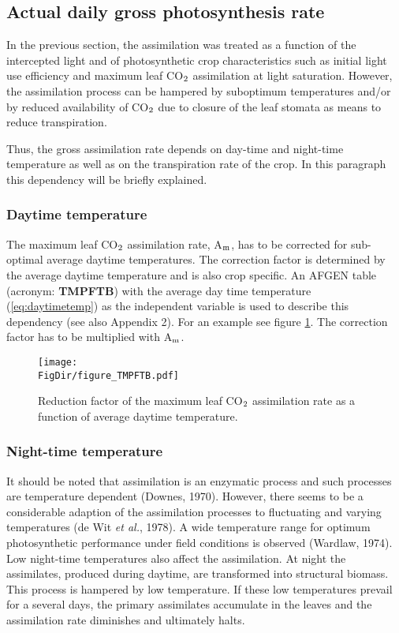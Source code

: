 \subsection{Actual daily gross photosynthesis rate}
\label{sec:ActualDailyGrossPhotosynthesis}

In the previous section, the assimilation was treated as a function of the intercepted light and of
photosynthetic crop characteristics such as initial light use efficiency and maximum leaf
CO$_{{\rm 2}}$ assimilation at light saturation. However, the assimilation process can be hampered by
suboptimum temperatures and/or by reduced availability of CO$_{{\rm 2}}$ due to closure of the leaf
stomata as means to reduce transpiration. 

Thus, the gross assimilation rate depends on day-time and night-time temperature as well as on the transpiration rate of the crop. In this paragraph this dependency will be briefly explained.


\subsubsection{Daytime temperature}
The maximum leaf CO$_{{\rm 2}}$ assimilation rate, A$_{{\rm m}}$, has to be corrected for sub-optimal average
daytime temperatures. The correction factor is determined by the average daytime
temperature and is also crop specific. An AFGEN table (acronym: {\bf TMPFTB}) with the
average day time temperature (\ref{eq:daytimetemp}) as the independent variable is used to describe this
dependency (see also Appendix 2). For an example see figure \ref{fig:TMPFTB}. 
The correction factor has to be multiplied with A$_{{\rm m}}$. 

\begin{figure}[p]
	\centering
	\texttt{[image: \\FigDir/figure\_TMPFTB.pdf]}
	\caption{Reduction factor of the maximum leaf CO$_{{\rm 2}}$ assimilation rate as a function of
		average daytime temperature.}
	\label{fig:TMPFTB}
\end{figure}

\subsubsection{Night-time temperature}
It should be noted that assimilation is an enzymatic process and such processes are
temperature dependent (Downes, 1970). However, there seems to be a considerable
adaption of the assimilation processes to fluctuating and varying temperatures (de Wit {\it et al.}, 1978). 
A wide temperature range for optimum photosynthetic performance under field
conditions is observed (Wardlaw, 1974). Low night-time temperatures also affect the
assimilation. At night the assimilates, produced during daytime, are transformed into
structural biomass. This process is hampered by low temperature. If these low temperatures prevail 
for a several days, the primary assimilates accumulate in the leaves and the assimilation rate diminishes 
and ultimately halts.

